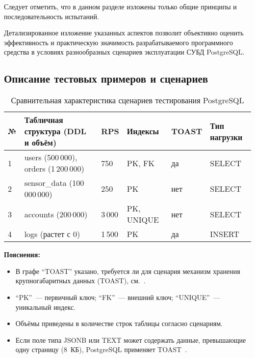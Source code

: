 Следует отметить, что в данном разделе изложены только общие принципы и последовательность испытаний. 

Детализированное изложение указанных аспектов позволит объективно оценить эффективность и практическую значимость 
разрабатываемого программного средства в условиях разнообразных сценариев эксплуатации СУБД PostgreSQL.

\subsection{Описание тестовых примеров и сценариев}

\begin{table}[htbp]
    \centering
    \captionsetup{justification=centering}
    \caption{Сравнительная характеристика сценариев тестирования PostgreSQL}
    \label{tab:scenarios_short}
    \begin{tabular}{|l|>{\raggedright}p{4.2cm}|l|l|l|l|}
        \hline
        № & Табличная структура (DDL и объём)    & RPS & Индексы & TOAST & Тип нагрузки \\
        \hline
        1 & users (500\,000), orders (1\,200\,000) & 750 & PK, FK & да & SELECT \\ \hline
        2 & sensor\_data (100\,000\,000) & 250 & PK & нет & SELECT \\ \hline
        3 & accounts (200\,000) & 3\,000 & PK, UNIQUE & нет & SELECT \\ \hline
        4 & logs (растет с 0) & 1\,500 & PK & да & INSERT \\ \hline
    \end{tabular}
    \vspace{0.5em}
\end{table}

\textbf{Пояснения:}
\begin{itemize}
    \item В графе ``TOAST'' указано, требуется ли для сценария механизм хранения крупногабаритных данных (TOAST), см.~\cite{postgres_toast}.
    \item ``PK''~--- первичный ключ; ``FK''~--- внешний ключ; ``UNIQUE''~--- уникальный индекс.
    \item Объёмы приведены в количестве строк таблицы согласно сценариям.
    \item Если поле типа JSONB или TEXT может содержать данные, превышающие одну страницу (8~КБ), PostgreSQL применяет TOAST~\cite{postgres_toast,postgres_docs}.
\end{itemize}

